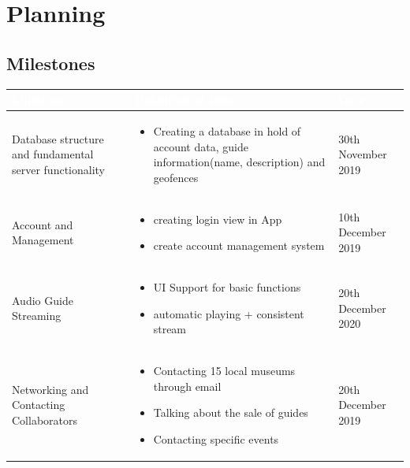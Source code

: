 \documentclass[12pt]{article}
\theoremstyle{definition}
\begin{document}
\section{Planning}
\subsection{Milestones}
\begin{tabular}{| m{9em} | m{9cm} | m{4cm} |}
    \cellcolor[gray]{0.5}\textcolor{white}{Milestone} &
    \cellcolor[gray]{0.5}\textcolor{white}{Definition of Done} &
    \cellcolor[gray]{0.5}\textcolor{white}{Date} \\ \hline
    
    Database structure and fundamental server functionality & 
    \begin{itemize} [topsep=0.2cm]
        \item Creating a database in hold of account data, guide information(name, description) and geofences
    \end{itemize} \nointerlineskip &
    30th November 2019 \\ \hline
    
    Account and Management &
    \begin{itemize} [topsep=0.2cm]
        \item creating login view in App
        \item create account management system
    \end{itemize} \nointerlineskip &
    10th December 2019 \\ \hline
    
    Audio Guide Streaming &
    \begin{itemize}
        \item UI Support for basic functions
        \item automatic playing + consistent stream
    \end{itemize} \nointerlineskip &
    20th December 2020 \\ \hline
    
    Networking and Contacting Collaborators &
    \begin{itemize} [topsep=0.2cm]
        \item Contacting 15 local museums through email
        \item Talking about the sale of guides
        		  \item Contacting specific events
    \end{itemize} \nointerlineskip &
    20th December 2019\\ \hline
    

\end{tabular}
\end{document}
